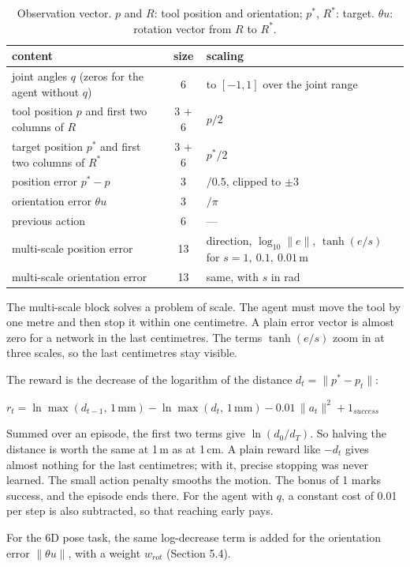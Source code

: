 \documentclass[10pt,a4paper]{article}
\newenvironment{eq}{\vspace{-5pt}\begin{center}$\displaystyle}{$\end{center}\vspace{-6pt}}
\newcommand{\sub}[1]{\vspace{1pt}{\bfseries #1}\par}
\begin{document}
\begin{table}[H]
\centering\small
\caption{Observation vector. $p$ and $R$: tool position and orientation; $p^*$, $R^*$: target. $\theta u$: rotation vector from $R$ to $R^*$.}
\label{tab:obs}
\begin{tabular}{lcl}
\toprule
content & size & scaling \\
\midrule
joint angles $q$ (zeros for the agent without $q$) & 6 & to $[-1,1]$ over the joint range \\
tool position $p$ and first two columns of $R$ & 3 + 6 & $p/2$ \\
target position $p^*$ and first two columns of $R^*$ & 3 + 6 & $p^*/2$ \\
position error $p^* - p$ & 3 & $/0.5$, clipped to $\pm 3$ \\
orientation error $\theta u$ & 3 & $/\pi$ \\
previous action & 6 & --- \\
multi-scale position error & 13 & direction, $\log_{10}\|e\|$, $\tanh(e/s)$ for $s = 1,\ 0.1,\ 0.01$\,m \\
multi-scale orientation error & 13 & same, with $s$ in rad \\
\bottomrule
\end{tabular}
\end{table}

The multi-scale block solves a problem of scale.
The agent must move the tool by one metre and then stop it within one centimetre.
A plain error vector is almost zero for a network in the last centimetres.
The terms $\tanh(e/s)$ zoom in at three scales, so the last centimetres stay visible.

\sub{3.4 Reward}
The reward is the decrease of the logarithm of the distance $d_t = \|p^* - p_t\|$:
\begin{eq}
r_t = \ln \max(d_{t-1},\, 1\,\mathrm{mm}) - \ln \max(d_t,\, 1\,\mathrm{mm}) - 0.01\, \|a_t\|^2 + 1_{success}
\end{eq}
Summed over an episode, the first two terms give $\ln(d_0 / d_T)$.
So halving the distance is worth the same at 1\,m as at 1\,cm.
A plain reward like $-d_t$ gives almost nothing for the last centimetres; with it, precise stopping was never learned.
The small action penalty smooths the motion.
The bonus of 1 marks success, and the episode ends there.
For the agent with $q$, a constant cost of 0.01 per step is also subtracted, so that reaching early pays.

For the 6D pose task, the same log-decrease term is added for the orientation error $\|\theta u\|$, with a weight $w_{rot}$ (Section 5.4).
\end{document}
